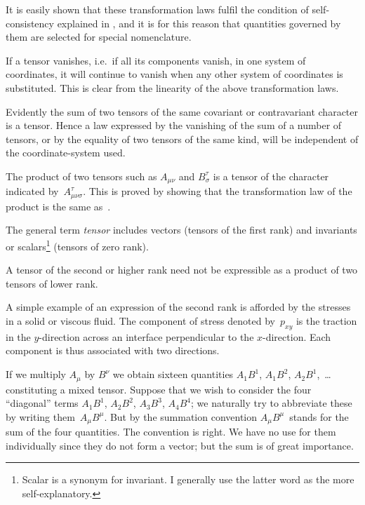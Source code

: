\documentclass[12pt]{book}
\begin{document}
It is easily shown that these transformation laws fulfil the condition of
self-consistency explained in , and it is for this reason that quantities
governed by them are selected for special nomenclature.

If a tensor vanishes, i.e.\ if all its components vanish, in one system of
coordinates, it will continue to vanish when any other system of coordinates
is substituted. This is clear from the linearity of the above transformation
laws.

Evidently the sum of two tensors of the same covariant or contravariant
character is a tensor. Hence a law expressed by the vanishing of the sum of
a number of tensors, or by the equality of two tensors of the same kind, will
be independent of the coordinate-system used.

The product of two tensors such as $A_{\mu\nu}$ and $B_{\sigma}^{\tau}$ is a tensor of the character
indicated by~$A_{\mu\nu\sigma}^{\tau}$. This is proved by showing that the transformation law of
the product is the same as~.

The general term \emph{tensor} includes vectors (tensors of the first rank) and
invariants or scalars\footnote
  {Scalar is a synonym for invariant. I generally use the latter word as the more self-explanatory.}
%
(tensors of zero rank).

A tensor of the second or higher rank need not be expressible as a product
of two tensors of lower rank.

A simple example of an expression of the second rank is afforded by the
stresses in a solid or viscous fluid. The component of stress denoted by~$p_{xy}$
is the traction in the $y$-direction across an interface perpendicular to the
$x$-direction. Each component is thus associated with two directions.


If we multiply $A_{\mu}$ by $B^{\nu}$ we obtain sixteen quantities $A_{1}B^{1}$, $A_{1}B^{2}$, $A_{2}B^{1}$,~\dots
constituting a mixed tensor. Suppose that we wish to consider the four
``diagonal'' terms $A_{1}B^{1}$, $A_{2}B^{2}$, $A_{3}B^{3}$, $A_{4}B^{4}$; we naturally try to abbreviate
these by writing them~$A_{\mu}B^{\mu}$. But by the summation convention $A_{\mu}B^{\mu}$~stands
for the sum of the four quantities. The convention is right. We have no use
for them individually since they do not form a vector; but the sum is of great
importance.
\end{document}
